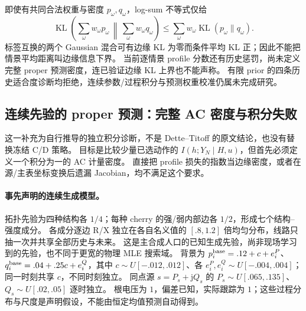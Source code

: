 \documentclass[UTF8,fontset=fandol,11pt,a4paper]{ctexart}
\begin{document}
即使有共同合法权重与密度 $p_\omega,q_\omega$，log-sum 不等式仅给
\[
 \operatorname{KL}\!\left(\sum_\omega w_\omega p_\omega\,\middle\|\,
                         \sum_\omega w_\omega q_\omega\right)
 \le\sum_\omega w_\omega\operatorname{KL}(p_\omega\|q_\omega).
\]
标签互换的两个 Gaussian 混合可有边缘 KL 为零而条件平均 KL 正；因此不能把情景平均距离叫边缘信息下界。
当前逐情景 profile 分数还有历史惩罚，尚未定义完整 proper 预测密度，连已验证边缘 KL 上界也不能声称。
有限 prior 的四条历史适合度诊断均拒绝，连续参数/过程积分与预测权重校准仍属未完成研究。

\subsection{连续先验的 proper 预测：完整 AC 密度与积分失败}
这一补充为自行推导的独立积分诊断，不是 Dette--Titoff 的原文结论，也没有替换冻结 C/D 策略。
目标是比较少量已选动作的 $I(h;Y_N\mid H,u)$，但首先必须定义一个积分为一的 AC 计量密度。
直接把 profile 损失的指数当边缘密度，或者在源/主表坐标变换后遗漏 Jacobian，均不满足这个要求。

\paragraph{事先声明的连续生成模型。}
拓扑先验为四种结构各 $1/4$；每种 cherry 的强/弱内部边各 $1/2$，形成七个结构--强度成分。
各成分逐边 R/X 独立在各自名义值的 $[.8,1.2]$ 倍均匀分布，线路只抽一次并共享全部历史与未来。
这是主合成人口的已知生成先验，尚非现场学习到的先验，也不同于更宽的物理 MLE 搜索域。
背景为 $p_i^{\rm base}=.12+c+e_i^P$、$q_i^{\rm base}=.04+.25c+e_i^Q$，其中 $c\sim U[-.012,.012]$、各 $e_i^P,e_i^Q\sim U[-.004,.004]$；同一时刻共享 $c$，不同时刻独立。
同点源 $s=P_s+\mathrm jQ_s$ 的 $P_s\sim U[.065,.135]$、$Q_s\sim U[.02,.05]$ 逐时独立。
根电压为 $1$，偏差已知，实际跟踪为 $1$；这些过程分布与尺度是声明假设，不能由恒定均值预测自动得到。
\end{document}
